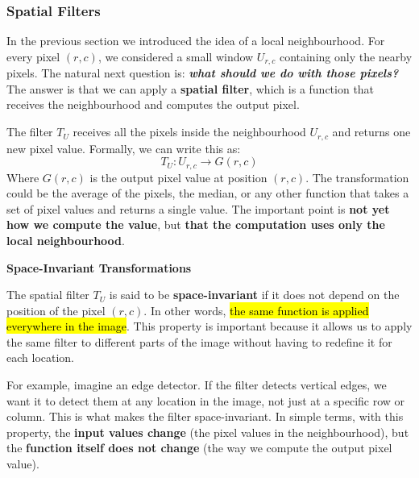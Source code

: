 \subsubsection{Spatial Filters}\label{sec:spatial-filters}

In the previous section we introduced the idea of a local neighbourhood. For every pixel $\left(r,c\right)$, we considered a small window $U_{r,c}$ containing only the nearby pixels. The natural next question is: \emph{\textbf{what should we do with those pixels?}} The answer is that we can apply a \textbf{spatial filter}, which is a function that receives the neighbourhood and computes the output pixel.

\highspace
The filter $T_U$ receives all the pixels inside the neighbourhood $U_{r,c}$ and returns one new pixel value. Formally, we can write this as:
\begin{equation}
    T_U: U_{r,c} \to G\left(r,c\right)
\end{equation}
Where $G\left(r,c\right)$ is the output pixel value at position $\left(r,c\right)$. The transformation could be the average of the pixels, the median, or any other function that takes a set of pixel values and returns a single value. The important point is \textbf{not yet how we compute the value}, but \textbf{that the computation uses only the local neighbourhood}.

\highspace
\begin{flushleft}
    \textcolor{Green3}{ \textbf{Space-Invariant Transformations}}
\end{flushleft}
The spatial filter $T_U$ is said to be \textbf{space-invariant} if it does not depend on the position of the pixel $\left(r,c\right)$. In other words, \hl{the same function is applied everywhere in the image}. This property is important because it allows us to apply the same filter to different parts of the image without having to redefine it for each location.

\highspace
For example, imagine an edge detector. If the filter detects vertical edges, we want it to detect them at any location in the image, not just at a specific row or column. This is what makes the filter space-invariant. In simple terms, with this property, the \textbf{input values change} (the pixel values in the neighbourhood), but the \textbf{function itself does not change} (the way we compute the output pixel value).

